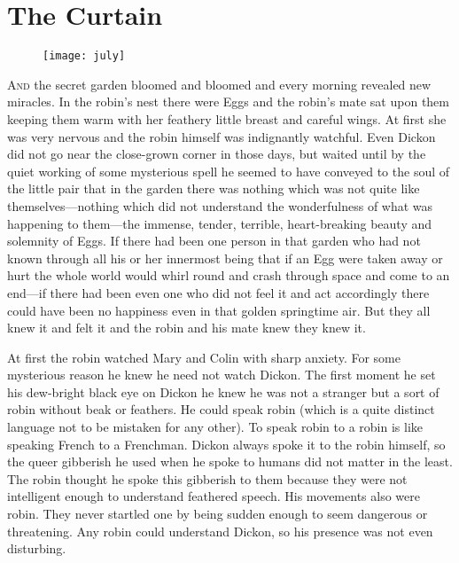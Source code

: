 \chapter{The Curtain} 
	
\begin{figure}[t!]
\centering
\texttt{[image: july]}
\end{figure}

 \lettrine[lines=6]{A}{nd} the secret garden bloomed and bloomed and every morning revealed new miracles. In the robin's nest there were Eggs and the robin's mate sat upon them keeping them warm with her feathery little breast and careful wings. At first she was very nervous and the robin himself was indignantly watchful. Even Dickon did not go near the close-grown corner in those days, but waited until by the quiet working of some mysterious spell he seemed to have conveyed to the soul of the little pair that in the garden there was nothing which was not quite like themselves—nothing which did not understand the wonderfulness of what was happening to them—the immense, tender, terrible, heart-breaking beauty and solemnity of Eggs. If there had been one person in that garden who had not known through all his or her innermost being that if an Egg were taken away or hurt the whole world would whirl round and crash through space and come to an end—if there had been even one who did not feel it and act accordingly there could have been no happiness even in that golden springtime air. But they all knew it and felt it and the robin and his mate knew they knew it.

At first the robin watched Mary and Colin with sharp anxiety. For some mysterious reason he knew he need not watch Dickon. The first moment he set his dew-bright black eye on Dickon he knew he was not a stranger but a sort of robin without beak or feathers. He could speak robin (which is a quite distinct language not to be mistaken for any other). To speak robin to a robin is like speaking French to a Frenchman. Dickon always spoke it to the robin himself, so the queer gibberish he used when he spoke to humans did not matter in the least. The robin thought he spoke this gibberish to them because they were not intelligent enough to understand feathered speech. His movements also were robin. They never startled one by being sudden enough to seem dangerous or threatening. Any robin could understand Dickon, so his presence was not even disturbing.

